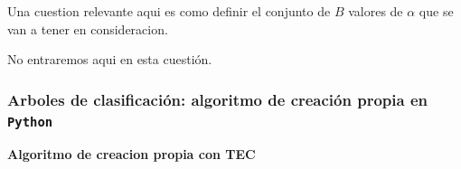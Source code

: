 \documentclass[
  11pt,
  a4paper,
]{article}
\begin{document}
Una cuestion relevante aqui es como definir el conjunto de \(B\) valores
de \(\alpha\) que se van a tener en consideracion.

No entraremos aqui en esta cuestión.

\newpage

\hypertarget{arboles-de-clasificaciuxf3n-algoritmo-de-creaciuxf3n-propia-en-python}{%
\subsubsection{\texorpdfstring{Arboles de clasificación: algoritmo de
creación propia en
\texttt{Python}}{Arboles de clasificación: algoritmo de creación propia en Python}}\label{arboles-de-clasificaciuxf3n-algoritmo-de-creaciuxf3n-propia-en-python}}

\textbf{Algoritmo de creacion propia con TEC}
\end{document}

